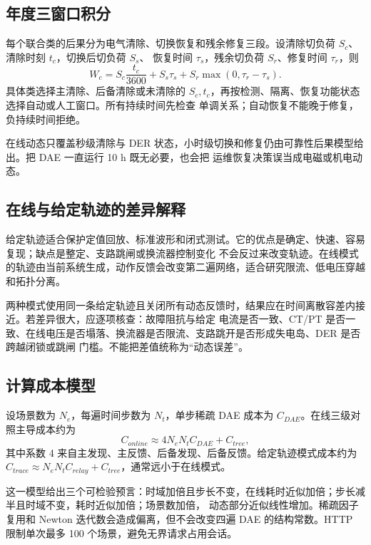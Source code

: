 \subsection{年度三窗口积分}
每个联合类的后果分为电气清除、切换恢复和残余修复三段。设清除切负荷 $S_c$、清除时刻 $t_c$，切换后切负荷 $S_s$、
恢复时间 $\tau_s$，残余切负荷 $S_r$、修复时间 $\tau_r$，则
\begin{equation}
 W_c=S_c\frac{t_c}{3600}+S_s\tau_s+S_r\max(0,\tau_r-\tau_s).
\end{equation}
具体类选择主清除、后备清除或未清除的 $S_c,t_c$，再按检测、隔离、恢复功能状态选择自动或人工窗口。所有持续时间先检查
单调关系；自动恢复不能晚于修复，负持续时间拒绝。

在线动态只覆盖秒级清除与 DER 状态，小时级切换和修复仍由可靠性后果模型给出。把 DAE 一直运行 10 h 既无必要，也会把
运维恢复决策误当成电磁或机电动态。

\subsection{在线与给定轨迹的差异解释}
给定轨迹适合保护定值回放、标准波形和闭式测试。它的优点是确定、快速、容易复现；缺点是整定、支路跳闸或换流器控制变化
不会反过来改变轨迹。在线模式的轨迹由当前系统生成，动作反馈会改变第二遍网络，适合研究限流、低电压穿越和拓扑分离。

两种模式使用同一条给定轨迹且关闭所有动态反馈时，结果应在时间离散容差内接近。若差异很大，应逐项核查：故障阻抗与给定
电流是否一致、CT/PT 是否一致、在线电压是否塌落、换流器是否限流、支路跳开是否形成失电岛、DER 是否跨越闭锁或跳闸
门槛。不能把差值统称为“动态误差”。

\subsection{计算成本模型}
设场景数为 $N_e$，每遍时间步数为 $N_t$，单步稀疏 DAE 成本为 $C_{DAE}$。在线三级对照主导成本约为
\begin{equation}
 C_{online}\approx4N_eN_tC_{DAE}+C_{tree},
\end{equation}
其中系数 4 来自主发现、主反馈、后备发现、后备反馈。给定轨迹模式成本约为
$C_{trace}\approx N_eN_tC_{relay}+C_{tree}$，通常远小于在线模式。

这一模型给出三个可检验预言：时域加倍且步长不变，在线耗时近似加倍；步长减半且时域不变，耗时近似加倍；场景数加倍，
动态部分近似线性增加。稀疏因子复用和 Newton 迭代数会造成偏离，但不会改变四遍 DAE 的结构常数。HTTP 限制单次最多
100 个场景，避免无界请求占用会话。


